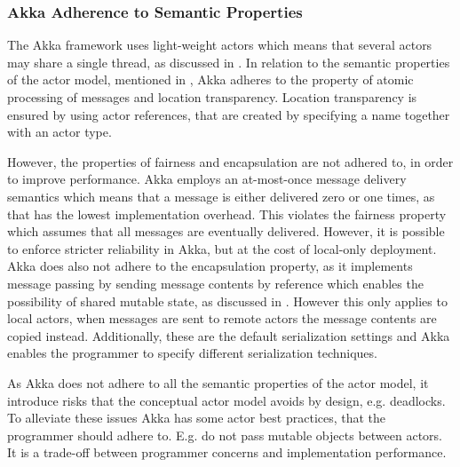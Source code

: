 {\subsubsection{Akka Adherence to Semantic Properties}
The Akka framework uses light-weight actors which means that several actors may share a single thread\cite[p. 13]{akkaDoc}, as discussed in . 
In relation to the semantic properties of the actor model, mentioned in , Akka adheres to the property of atomic processing of messages and location transparency. Location transparency is ensured by using actor references, that are created by specifying a name together with an actor type\cite[p. 24]{akkaDoc}. 

However, the properties of fairness and encapsulation are not adhered to, in order to improve performance. Akka employs an at-most-once message delivery semantics which means that a message is either delivered zero or one times, as that has the lowest implementation overhead\cite[p. 27]{akkaDoc}. This violates the fairness property which assumes that all messages are eventually delivered. However, it is possible to enforce stricter reliability in Akka, but at the cost of local-only deployment\cite[p. 29]{akkaDoc}. Akka does also not adhere to the encapsulation property, as it implements message passing by sending message contents by reference which enables the possibility of shared mutable state, as discussed in . However this only applies to local actors, when messages are sent to remote actors the message contents are copied instead. Additionally, these are the default serialization settings and Akka enables the programmer to specify different serialization techniques\cite[p. 219]{akkaDoc}.

As Akka does not adhere to all the semantic properties of the actor model, it introduce risks that the conceptual actor model avoids by design, e.g. deadlocks. To alleviate these issues Akka has some actor best practices, that the programmer should adhere to. E.g. do not pass mutable objects between actors\cite[p. 12]{akkaDoc}. It is a trade-off between programmer concerns and implementation performance.


}
